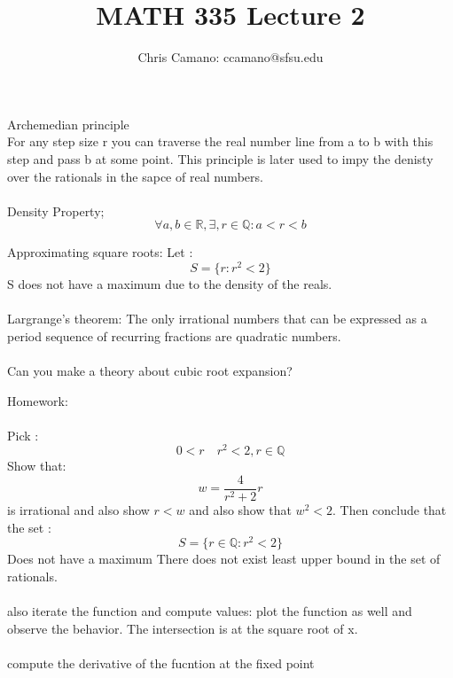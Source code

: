\documentclass[12pt]{article}
\author{Chris Camano: ccamano@sfsu.edu}
\title{MATH 335  Lecture 2 }
\date
\newcommand{\R}{\mathbb{R}}
\newcommand{\Q}{\mathbb{Q}}
\theoremstyle{definition}
\theoremstyle{remark}
\numberwithin{equation}{section}
\begin{document}
\maketitle
{} Archemedian principle\\
For any step size r you can traverse the real number line from a to b with this step and pass b at some point. This principle is later used to impy the denisty over the rationals in the sapce of real numbers. \\\\
 Density Property;
\[
  \forall a,b \in \R, \exists  , r \in \mathbb{Q} : a<r<b
\]

Approximating square roots:
Let :
\[
  S=\{r: r^2<2\}
\]
S does not have a maximum due to the density of the reals. \\\\
\thm Largrange's theorem: The only irrational numbers that can be expressed as a period sequence of recurring fractions are quadratic numbers. \\\\

Can you make a theory about cubic root expansion?

Homework: \\\\
Pick :
\[
  0<r\quad r^2<2, r\in \Q
\]
Show that: \[
  w=\frac{4}{r^2+2}r
\]
is irrational and also show $r<w$ and also show that $w^2<2$. Then conclude that the set :
\[
  S=\{r\in \Q: r^2<2\}
\]
Does not have a maximum There does not exist least upper bound in the set of rationals. \\\\also iterate the function and compute values: plot the function as well and observe the behavior. The intersection is at the square root of x. \\\\
compute the derivative of the fucntion at the fixed point 
\end{document}
